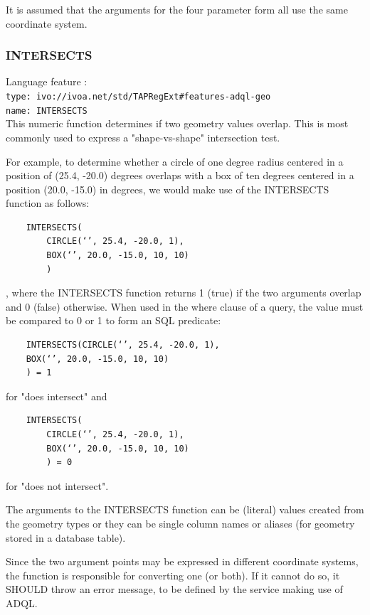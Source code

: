 \documentclass[11pt,a4paper]{ivoa}
\begin{document}
It is assumed that the arguments for the four parameter form all use
the same coordinate system.

\subsubsection{INTERSECTS}
\label{sec:geom.functions.intersects}
{\footnotesize Language feature :}\\
{\footnotesize \verb|type: ivo://ivoa.net/std/TAPRegExt#features-adql-geo|}\\
{\footnotesize \verb|name: INTERSECTS|}\\

This numeric function determines if two geometry values overlap. This is
most commonly used to express a "shape-vs-shape" intersection test.

For example, to determine whether a circle of one degree radius centered
in a position of (25.4, -20.0) degrees overlaps with a box of ten degrees
centered in a position (20.0, -15.0) in degrees, we would make use of the
INTERSECTS function as follows:

\begin{verbatim}
    INTERSECTS(
        CIRCLE(‘’, 25.4, -20.0, 1),
        BOX(‘’, 20.0, -15.0, 10, 10)
        )
\end{verbatim}

, where the INTERSECTS function returns 1 (true) if the two arguments overlap
and 0 (false) otherwise. When used in the where clause of a query, the value
must be compared to 0 or 1 to form an SQL predicate:

\begin{verbatim}
    INTERSECTS(CIRCLE(‘’, 25.4, -20.0, 1),
    BOX(‘’, 20.0, -15.0, 10, 10)
    ) = 1
\end{verbatim}

for "does intersect" and

\begin{verbatim}
    INTERSECTS(
        CIRCLE(‘’, 25.4, -20.0, 1),
        BOX(‘’, 20.0, -15.0, 10, 10)
        ) = 0
\end{verbatim}

for "does not intersect".

The arguments to the INTERSECTS function can be (literal) values created from
the geometry types or they can be single column names or aliases (for geometry
stored in a database table).

Since the two argument points may be expressed in different coordinate
systems, the function is responsible for converting one (or both). If it
cannot do so, it SHOULD throw an error message, to be defined by the service
making use of ADQL.
\end{document}
